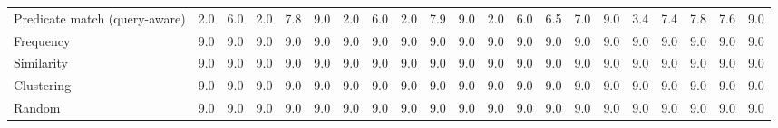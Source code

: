 \begin{tabular}{lrrrrrrrrrrrrrrrrrrrr}
Predicate match (query-aware) & 2.0 & 6.0 & 2.0 & 7.8 & 9.0 & 2.0 & 6.0 & 2.0 & 7.9 & 9.0 & 2.0 & 6.0 & 6.5 & 7.0 & 9.0 & 3.4 & 7.4 & 7.8 & 7.6 & 9.0 \\
Frequency & 9.0 & 9.0 & 9.0 & 9.0 & 9.0 & 9.0 & 9.0 & 9.0 & 9.0 & 9.0 & 9.0 & 9.0 & 9.0 & 9.0 & 9.0 & 9.0 & 9.0 & 9.0 & 9.0 & 9.0 \\
Similarity & 9.0 & 9.0 & 9.0 & 9.0 & 9.0 & 9.0 & 9.0 & 9.0 & 9.0 & 9.0 & 9.0 & 9.0 & 9.0 & 9.0 & 9.0 & 9.0 & 9.0 & 9.0 & 9.0 & 9.0 \\
Clustering & 9.0 & 9.0 & 9.0 & 9.0 & 9.0 & 9.0 & 9.0 & 9.0 & 9.0 & 9.0 & 9.0 & 9.0 & 9.0 & 9.0 & 9.0 & 9.0 & 9.0 & 9.0 & 9.0 & 9.0 \\
Random & 9.0 & 9.0 & 9.0 & 9.0 & 9.0 & 9.0 & 9.0 & 9.0 & 9.0 & 9.0 & 9.0 & 9.0 & 9.0 & 9.0 & 9.0 & 9.0 & 9.0 & 9.0 & 9.0 & 9.0 \\
\bottomrule
\end{tabular}
